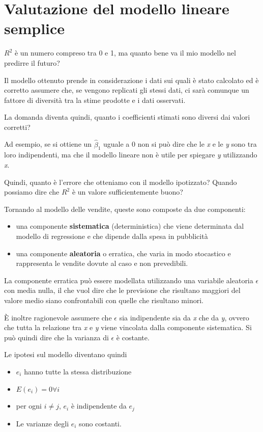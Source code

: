 \section{Valutazione del modello lineare semplice}\label{i-residui}

$R^{2}$ è un numero compreso tra 0 e 1, ma quanto bene va il mio
modello nel predirre il futuro?

Il modello ottenuto prende in considerazione i dati sui quali è stato
calcolato ed è corretto assumere che, se vengono replicati gli stessi
dati, ci sarà comunque un fattore di diversità tra la stime prodotte e i
dati osservati.

La domanda diventa quindi, quanto i coefficienti stimati sono diversi dai
valori corretti? 

Ad esempio, se si ottiene un $\hat{\beta}_1$ uguale a 0 non si può dire che le \emph{x} e le \emph{y} sono tra loro
indipendenti, ma che il modello lineare non è utile per spiegare \emph{y} utilizzando \emph{x}.

Quindi, quanto è l'errore che otteniamo con il modello ipotizzato?
Quando possiamo dire che $R^2$ è un valore sufficientemente
buono?

Tornando al modello delle vendite, queste sono composte da due
componenti:

\begin{itemize}
\item
  una componente \textbf{sistematica} (deterministica) che viene
  determinata dal modello di regressione e che dipende dalla spesa in
  pubblicità
\item
  una componente \textbf{aleatoria} o erratica, che varia in modo
  stocastico e rappresenta le vendite dovute al caso e non prevedibili.
\end{itemize}

La componente erratica può essere modellata utilizzando una variabile
aleatoria $\epsilon$ con media nulla, il che vuol dire che le
previsione che risultano maggiori del valore medio siano confrontabili
con quelle che risultano minori.

È inoltre ragionevole assumere che $\epsilon$ sia indipendente sia
da \emph{x} che da \emph{y}, ovvero che tutta la relazione tra \emph{x}
e \emph{y} viene vincolata dalla componente sistematica. Si può
quindi dire che la varianza di $\epsilon$ è costante.

Le ipotesi sul modello diventano quindi

\begin{itemize}
\item
  $e_i$ hanno tutte la stessa distribuzione
\item
  $E(e_i) = 0 \forall i$
\item
  per ogni $i\neq j$, $e_i$ è indipendente da $e_j$
\item
  Le varianze degli $e_i$ sono costanti.
\end{itemize}

